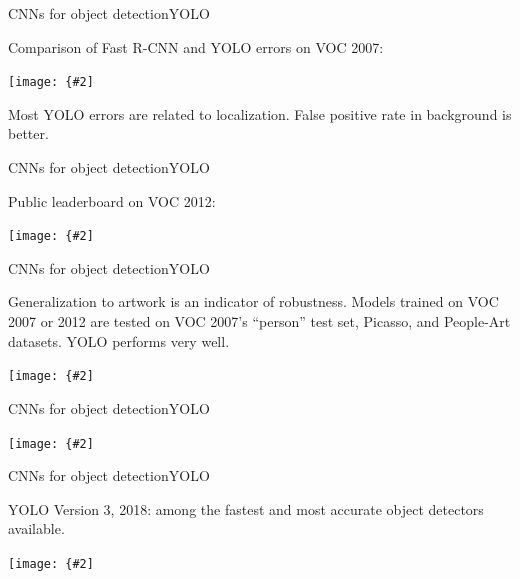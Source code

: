 \documentclass[aspectratio=169]{beamer}
\newcommand{\myfig}[3]{\centerline{\texttt{[image: \{\#2]}}}
\begin{document}
\begin{frame}{CNNs for object detection}{YOLO}

  Comparison of Fast R-CNN and YOLO errors on VOC 2007:

  \medskip
  
  \myfig{3in}{redmon-fig4}{Redmon et al.\ (2016), Fig.\ 4}

  \medskip

  Most YOLO errors are related to localization. False positive rate in
  background is better.
  
\end{frame}


\begin{frame}{CNNs for object detection}{YOLO}

  Public leaderboard on VOC 2012:

  \medskip
  
  \myfig{4.5in}{redmon-table3}{Redmon et al.\ (2016), Table 3}

\end{frame}


\begin{frame}{CNNs for object detection}{YOLO}

  Generalization to artwork is an indicator of robustness.  Models
  trained on VOC 2007 or 2012 are tested on VOC 2007's ``person'' test
  set, Picasso, and People-Art datasets. YOLO performs very well.

  \medskip
  
  \myfig{4.5in}{redmon-fig5}{Redmon et al.\ (2016), Fig.\ 5}

\end{frame}


\begin{frame}{CNNs for object detection}{YOLO}

  \myfig{4.5in}{redmon-fig6}{Redmon et al.\ (2016), Fig.\ 6}

\end{frame}



\begin{frame}{CNNs for object detection}{YOLO}

  YOLO Version 3, 2018: among the fastest and most accurate object
  detectors available.

  \medskip

  \myfig{4in}{yolo-v3}{\url{https://towardsdatascience.com/yolo-v3-object-detection-53fb7d3bfe6b}}  
  
\end{frame}
\end{document}

